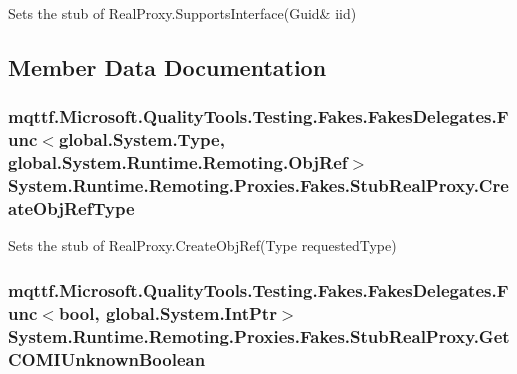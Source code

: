 Sets the stub of Real\-Proxy.\-Supports\-Interface(Guid\& iid)



\subsection{Member Data Documentation}
\hypertarget{class_system_1_1_runtime_1_1_remoting_1_1_proxies_1_1_fakes_1_1_stub_real_proxy_ae40ab7bdc0dda791dbef931814d1fb6d}{
\subsubsection[{Create\-Obj\-Ref\-Type}]{\setlength{\rightskip}{0pt plus 5cm}mqttf.\-Microsoft.\-Quality\-Tools.\-Testing.\-Fakes.\-Fakes\-Delegates.\-Func$<$global.\-System.\-Type, global.\-System.\-Runtime.\-Remoting.\-Obj\-Ref$>$ System.\-Runtime.\-Remoting.\-Proxies.\-Fakes.\-Stub\-Real\-Proxy.\-Create\-Obj\-Ref\-Type}}\label{class_system_1_1_runtime_1_1_remoting_1_1_proxies_1_1_fakes_1_1_stub_real_proxy_ae40ab7bdc0dda791dbef931814d1fb6d}


Sets the stub of Real\-Proxy.\-Create\-Obj\-Ref(\-Type requested\-Type)

\hypertarget{class_system_1_1_runtime_1_1_remoting_1_1_proxies_1_1_fakes_1_1_stub_real_proxy_ad48faec0fed1ab5a608c8c50b598f3f2}{
\subsubsection[{Get\-C\-O\-M\-I\-Unknown\-Boolean}]{\setlength{\rightskip}{0pt plus 5cm}mqttf.\-Microsoft.\-Quality\-Tools.\-Testing.\-Fakes.\-Fakes\-Delegates.\-Func$<$bool, global.\-System.\-Int\-Ptr$>$ System.\-Runtime.\-Remoting.\-Proxies.\-Fakes.\-Stub\-Real\-Proxy.\-Get\-C\-O\-M\-I\-Unknown\-Boolean}}\label{class_system_1_1_runtime_1_1_remoting_1_1_proxies_1_1_fakes_1_1_stub_real_proxy_ad48faec0fed1ab5a608c8c50b598f3f2}


